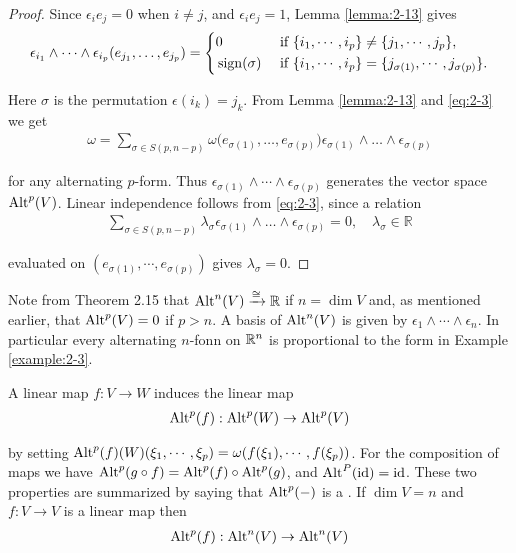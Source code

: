 \begin{proof}
  Since $\epsilon_i{e_j} = 0$ when $i\neq j$, and $\epsilon_i{e_j}= 1$, Lemma \ref{lemma:2-13} gives 
  \begin{align}\label{eq:2-3}
    \epsilon_{i_1}\wedge\cdots\wedge\epsilon_{i_p}(e_{j_1},\ldots,e_{j_p})
    = \left\{\begin{aligned}
      & 0             && \text{ if } \{i_1, \cdots, i_p\}\neq \{j_1, \cdots, j_p\},\\
      & \operatorname{sign}(\sigma) && \text{ if } \{i_1, \cdots, i_p\} = \{j_{\sigma(1)}, \cdots, j_{\sigma(p)}\}.
    \end{aligned}\right.
  \end{align}

  Here $\sigma$ is the permutation $\epsilon(i_k) = j_k$. From Lemma \ref{lemma:2-13} and \eqref{eq:2-3} we get
  \begin{align*}
    \omega = \sum_{\sigma\in S(p,n-p)}\omega\big(e_{\sigma(1)},\ldots,e_{\sigma(p)}\big)
      \epsilon_{\sigma(1)}\wedge\ldots\wedge\epsilon_{\sigma(p)}
  \end{align*}

  for any alternating $p$-form. Thus $\epsilon_{\sigma(1)}\wedge\cdots\wedge\epsilon_{\sigma(p)}$ generates 
  the vector space $\operatorname{Alt}^p(V)$. Linear independence follows from \eqref{eq:2-3}, since a relation
  \begin{align*}
    \sum_{\sigma\in S(p,n-p)}\lambda_{\sigma}\epsilon_{\sigma(1)}\wedge\ldots\wedge\epsilon_{\sigma(p)}=0,\quad\lambda_{\sigma}\in\mathbb{R}
  \end{align*}

  evaluated on $(e_{\sigma(1)}, \cdots, e_{\sigma(p)})$ gives $\lambda_{\sigma} = 0$.
\end{proof}

Note from Theorem 2.15 that $\operatorname{Alt}^n(V)\xrightarrow[]{\cong}\mathbb{R}$ if $n = \dim V$ and, as mentioned
earlier, that $\operatorname{Alt}^p(V) = 0$ if $p > n$. A basis of $\operatorname{Alt}^n(V)$ is given by $\epsilon_{1}\wedge\cdots\wedge\epsilon_{n}$.
In particular every alternating $n$-fonn on $\mathbb{R}^n$ is proportional to the form in Example \ref{example:2-3}.

A linear map $f:V\to W$ induces the linear map 
\begin{align}\label{eq:2-4}
  \operatorname{Alt}^p(f): \operatorname{Alt}^p(W)\to\operatorname{Alt}^p(V)
\end{align}

by setting $\operatorname{Alt}^p(f)(W)(\xi_1, \cdots, \xi_p) = \omega(f(\xi_1), \cdots, f(\xi_p))$. For the composition of
maps we have $\operatorname{Alt}^p(g\circ f) = \operatorname{Alt}^p(f)\circ\operatorname{Alt}^p(g)$, and $\operatorname{Alt}^P(\operatorname{id}) = \operatorname{id}$. These two
properties are summarized by saying that $\operatorname{Alt}^p(-)$ is a . If $\dim V = n$ and 
$f:V\to V$ is a linear map then
\begin{align*}
  \operatorname{Alt}^p(f): \operatorname{Alt}^n(V)\to\operatorname{Alt}^n(V)
\end{align*}

